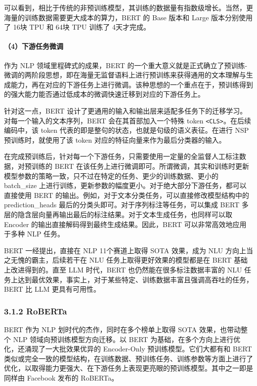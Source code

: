 \documentclass[12pt,a4paper]{book}
\begin{document}
可以看到，相比于传统的非预训练模型，其训练的数据量有指数级增长。当然，更海量的训练数据需要更大成本的算力，BERT
的 Base 版本和 Large 版本分别使用了 16块 TPU 和 64块 TPU 训练了
4天才完成。

\paragraph{（4）下游任务微调}\label{ux4e0bux6e38ux4efbux52a1ux5faeux8c03}

作为 NLP 领域里程碑式的成果，BERT
的一个重大意义就是正式确立了预训练-微调的两阶段思想，即在海量无监督语料上进行预训练来获得通用的文本理解与生成能力，再在对应的下游任务上进行微调。该种思想的一个重点在于，预训练得到的强大能力能否通过低成本的微调快速迁移到对应的下游任务上。

针对这一点，BERT
设计了更通用的输入和输出层来适配多任务下的迁移学习。对每一个输入的文本序列，BERT
会在其首部加入一个特殊 token
\texttt{\textless{}CLS\textgreater{}}。在后续编码中，该 token
代表的即是整句的状态，也就是句级的语义表征。在进行 NSP
预训练时，就使用了该 token 对应的特征向量来作为最后分类器的输入。

在完成预训练后，针对每一个下游任务，只需要使用一定量的全监督人工标注数据，对预训练的
BERT
在该任务上进行微调即可。所谓微调，其实和训练时更新模型参数的策略一致，只不过在特定的任务、更少的训练数据、更小的
batch\_size
上进行训练，更新参数的幅度更小。对于绝大部分下游任务，都可以直接使用
BERT 的输出。例如，对于文本分类任务，可以直接修改模型结构中的
prediction\_heads 最后的分类头即可。对于序列标注等任务，可以集成 BERT
多层的隐含层向量再输出最后的标注结果。对于文本生成任务，也同样可以取
Encoder 的输出直接解码得到最终生成结果。因此，BERT
可以非常高效地应用于多种 NLP 任务。

BERT 一经提出，直接在 NLP 11个赛道上取得 SOTA 效果，成为 NLU
方向上当之无愧的霸主，后续若干在 NLU 任务上取得更好效果的模型都是在 BERT
基础上改进得到的。直至 LLM 时代，BERT 也仍然能在很多标注数据丰富的 NLU
任务上达到最优效果，事实上，对于某些特定、训练数据丰富且强调高吞吐的任务，BERT
比 LLM 更具有可用性。

\subsubsection{3.1.2 RoBERTa}\label{roberta}

BERT 作为 NLP 划时代的杰作，同时在多个榜单上取得 SOTA 效果，也带动整个
NLP 领域向预训练模型方向迁移。以 BERT
为基础，在多个方向上进行优化，还涌现了一大批效果优异的 Encoder-Only
预训练模型。它们大都有和 BERT
类似或完全一致的模型结构，在训练数据、预训练任务、训练参数等方面上进行了优化，以取得能力更强大、在下游任务上表现更亮眼的预训练模型。其中之一即是同样由
Facebook 发布的 RoBERTa。
\end{document}
